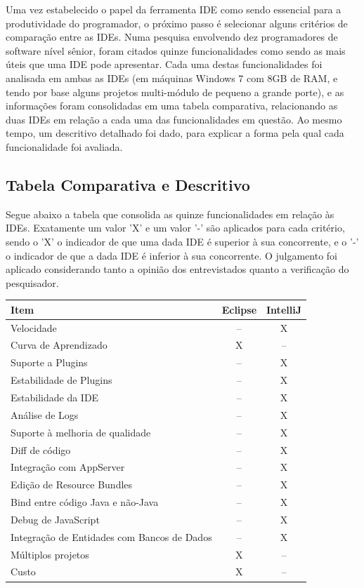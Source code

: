 \documentclass[12pt,journal,compsoc]{IEEEtran}
\begin{document}
Uma vez estabelecido o papel da ferramenta IDE como sendo essencial para a produtividade do programador, o próximo passo é selecionar alguns critérios de comparação entre as IDEs. Numa pesquisa envolvendo dez programadores de software nível sênior, foram citados quinze funcionalidades como sendo as mais úteis que uma IDE pode apresentar. Cada uma destas funcionalidades foi analisada em ambas as IDEs (em máquinas Windows 7 com 8GB de RAM, e tendo por base alguns projetos multi-módulo de pequeno a grande porte), e as informações foram consolidadas em uma tabela comparativa, relacionando as duas IDEs em relação a cada uma das funcionalidades em questão. Ao mesmo tempo, um descritivo detalhado foi dado, para explicar a forma pela qual cada funcionalidade foi avaliada.

\subsection{Tabela Comparativa e Descritivo}

Segue abaixo a tabela que consolida as quinze funcionalidades em relação às IDEs. Exatamente um valor 'X' e um valor '-' são aplicados para cada critério, sendo o 'X' o indicador de que uma dada IDE é superior à sua concorrente, e o '-' o indicador de que a dada IDE é inferior à sua concorrente. O julgamento foi aplicado considerando tanto a opinião dos entrevistados quanto a verificação do pesquisador.

\begin{center}
  \begin{tabular}{| p{5cm} | c | c |}
    \hline
    Item & Eclipse & IntelliJ \\ 
    \hline
    Velocidade & -- & X \\  \hline
    Curva de Aprendizado & X & -- \\ \hline
    Suporte a Plugins & -- & X \\ \hline
    Estabilidade de Plugins & -- & X \\ \hline
    Estabilidade da IDE & -- & X \\ \hline
    Análise de Logs & -- & X \\ \hline
    Suporte à melhoria de qualidade & -- & X \\ \hline
    Diff de código & -- & X \\ \hline
    Integração com AppServer & -- & X \\ \hline
    Edição de Resource Bundles & -- & X \\ \hline
    Bind entre código Java e não-Java & -- & X \\ \hline
    Debug de JavaScript & -- & X \\ \hline
    Integração de Entidades com Bancos de Dados & -- & X \\ \hline
    Múltiplos projetos & X & -- \\ \hline
    Custo & X & -- \\ \hline
    \end{tabular}
\end{center}
\end{document}
